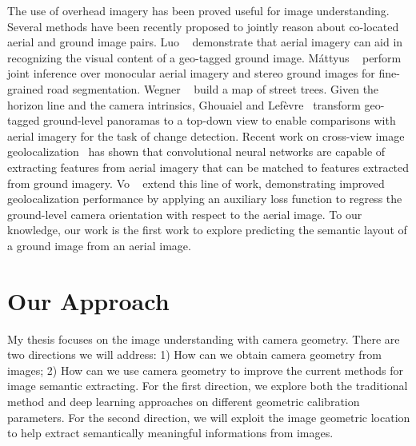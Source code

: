 The use of overhead imagery has been proved useful for image
understanding.
Several methods have been recently proposed to jointly reason about
co-located aerial and ground image pairs. Luo
\etal~\cite{luo2008event} demonstrate that aerial imagery can aid
in recognizing the visual content of a geo-tagged ground image.
M{\'a}ttyus \etal~\cite{mattyus2016hd} perform joint inference over
monocular aerial imagery and stereo ground images for fine-grained
road segmentation. Wegner \etal~\cite{wegner2016cataloging} build a
map of street trees. Given the horizon line and the camera intrinsics,
Ghouaiel and Lef{\`e}vre~\cite{ghouaiel2016coupling} transform
geo-tagged ground-level panoramas to a top-down view to enable
comparisons with aerial imagery for the task of change detection.
Recent work on cross-view image
geolocalization~\cite{lin2013cross,lin2015learning,workman2015geocnn,workman2015wide}
 has shown that convolutional neural
networks are capable of extracting features from aerial imagery
that can be matched to features extracted from ground imagery.
Vo \etal~\cite{vo2016localizing} extend this line of work,
demonstrating improved geolocalization performance by applying an
auxiliary loss function to regress the ground-level camera orientation
with respect to the aerial image. To our knowledge, our work is the
first work to explore predicting the semantic layout of a ground
image from an aerial image.



\section{Our Approach}
My thesis focuses on the image understanding with camera geometry.
There are two directions we will address: 1) How can we obtain camera
geometry from images; 2) How can we use camera geometry to improve the
current methods for image semantic extracting. For the first direction,
we explore both the traditional method and deep learning approaches on
different geometric calibration parameters. For the second direction,
we will exploit the image geometric location to help extract
semantically meaningful informations from images.

